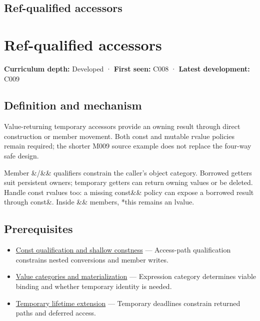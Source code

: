 \hypertarget{appendix-d42039b1d6f7}{}
\section*{Ref-qualified accessors}
\chapter{Ref-qualified accessors}\label{appendix-d42039b1d6f7-ref-qualified-accessors}

\textbf{Curriculum depth:} Developed · \textbf{First seen:} C008 · \textbf{Latest development:} C009

\section{Definition and mechanism}\label{appendix-d42039b1d6f7-definition-and-mechanism}

Value-returning temporary accessors provide an owning result through direct construction or member movement. Both const and mutable rvalue policies remain required; the shorter M009 source example does not replace the four-way safe design.

Member \&/\&\& qualifiers constrain the caller's object category. Borrowed getters suit persistent owners; temporary getters can return owning values or be deleted. Handle const rvalues too: a missing const\&\& policy can expose a borrowed result through const\&. Inside \&\& members, *this remains an lvalue.

\section{Prerequisites}\label{appendix-d42039b1d6f7-prerequisites}

\begin{itemize}
\tightlist
\item
  \hyperref[appendix-c25d60fed375]{Const qualification and shallow constness} --- Access-path qualification constrains nested conversions and member writes.
\item
  \hyperref[appendix-1121b30eaeb0]{Value categories and materialization} --- Expression category determines viable binding and whether temporary identity is needed.
\item
  \hyperref[appendix-a978b29bbbb0]{Temporary lifetime extension} --- Temporary deadlines constrain returned paths and deferred access.
\end{itemize}

